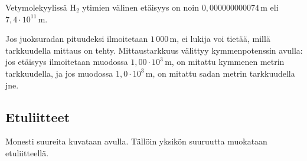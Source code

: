 \begin{esimerkki}
Vetymolekyylissä H$_2$ ytimien välinen etäisyys on noin $0,000000000074$\,m eli $7,4\cdot10^{11}$\,m. 
\end{esimerkki}

\begin{esimerkki}
Jos juoksuradan pituudeksi ilmoitetaan $1\,000$\,m, ei lukija voi tietää, millä tarkkuudella mittaus on tehty. Mittaustarkkuus välittyy kymmenpotenssin avulla: jos etäisyys ilmoitetaan muodossa $1,00\cdot10^{3}$\,m, on mitattu kymmenen metrin tarkkuudella, ja jos muodossa $1,0\cdot10^{3}$\,m, on mitattu sadan metrin tarkkuudella jne.
\end{esimerkki}

\subsection*{Etuliitteet}

Monesti suureita kuvataan  avulla. Tällöin yksikön suuruutta muokataan etuliitteellä.


